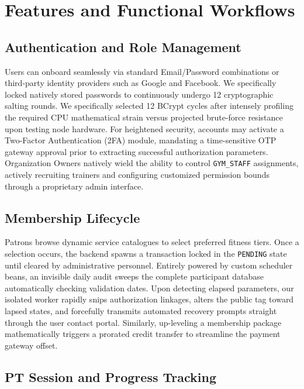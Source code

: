 \section{Features and Functional
Workflows}\label{features-and-functional-workflows}

\subsection{Authentication and Role
Management}\label{authentication-and-role-management}

Users can onboard seamlessly via standard Email/Password combinations or
third-party identity providers such as Google and Facebook. We
specifically locked natively stored passwords to continuously undergo 12
cryptographic salting rounds. We specifically selected 12 BCrypt cycles
after intensely profiling the required CPU mathematical strain versus
projected brute-force resistance upon testing node hardware. For
heightened security, accounts may activate a Two-Factor Authentication
(2FA) module, mandating a time-sensitive OTP gateway approval prior to
extracting successful authorization parameters. Organization Owners
natively wield the ability to control \texttt{GYM\_STAFF} assignments,
actively recruiting trainers and configuring customized permission
bounds through a proprietary admin interface.

\subsection{Membership Lifecycle}\label{membership-lifecycle}

Patrons browse dynamic service catalogues to select preferred fitness
tiers. Once a selection occurs, the backend spawns a transaction locked
in the \texttt{PENDING} state until cleared by administrative personnel.
Entirely powered by custom scheduler beans, an invisible daily audit
sweeps the complete participant database automatically checking
validation dates. Upon detecting elapsed parameters, our isolated worker
rapidly snips authorization linkages, alters the public tag toward
lapsed states, and forcefully transmits automated recovery prompts
straight through the user contact portal. Similarly, up-leveling a
membership package mathematically triggers a prorated credit transfer to
streamline the payment gateway offset.

\subsection{PT Session and Progress
Tracking}\label{pt-session-and-progress-tracking}

